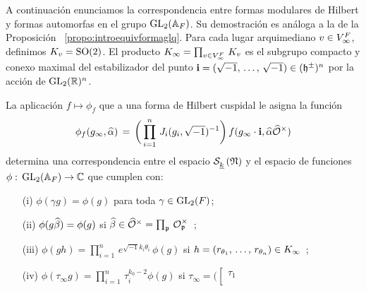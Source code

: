 A continuaci\'{o}n enunciamos la correspondencia entre formas modulares de
Hilbert y formas automorfas en el grupo $\GL_{2}(\adeles{F})$. Su
demostraci\'{o}n es an\'{a}loga a la de la Proposici\'{o}n~%
\ref{propo:introequivformaglq}.
Para cada lugar arquimediano $v\in\lugares[\infty]{F}$, definimos
$K_{v}=\SO{2}$. El producto $K_{\infty}=\prod_{v\in\lugares[\infty]{F}}\,K_{v}$
es el subgrupo compacto y conexo maximal del estabilizador
del punto $\mathbf{i}=(\sqrt{-1},\,\dots,\,\sqrt{-1})\in(\hP^{\pm})^{n}$ por la
acci\'{o}n de $\GL_{2}(\bb{R})^{n}$.

\begin{propoEquivalenciaAutomorfasFormasCuspidales}
	\label{propo:equivalenciaautomorfasformascuspidales}
	La aplicaci\'{o}n $f\mapsto\phi_{f}$ que a una forma de Hilbert
	cuspidal le asigna la funci\'{o}n
	\begin{equation}
		\label{eq:funcionadelicacorrespondientedehilbert}
		\phi_{f}(g_{\infty},\hhat{\alpha}) \,=\,
		\bigg(\prod_{i=1}^{n}\,J_{i}(g_{i},\sqrt{-1})^{-1}\bigg)\,
		f(g_{\infty}\cdot\mathbf{i},\hhat{\alpha}\Idfin{\cal{O}})
	\end{equation}
	determina una correspondencia entre el espacio $\spitzH{k}{\frak{N}}$
	y el espacio de funciones $\phi:\,\GL_{2}(\adeles{F})%
	\rightarrow\bb{C}$ que cumplen con:
	\begin{itemize}
		\item[(i)] $\phi(\gamma g)=\phi(g)$ para toda
			$\gamma\in\GL_{2}(F)$;
		\item[(ii)] $\phi(g\hhat{\beta})=\phi(g)$ si
			\begin{math}
				\hhat{\beta}\in\Idfin{\cal{O}}=
					\prod_{\frak{p}}\,
					\cal{O}_{\frak{p}}^{\times}
			\end{math}~;
		\item[(iii)]
			\begin{math}
				\phi(gh)=\prod_{i=1}^{n}\,
					e^{\sqrt{-1}k_{i}\theta_{i}}\,\phi(g)
			\end{math}
			si
			\begin{math}
				h=(\lista[\theta_{1}]{r}{\theta_{n}})
					\in K_{\infty}
			\end{math}~;
		\item[(iv)]
			\begin{math}
				\phi(\tau_{\infty}g)=\prod_{i=1}^{n}\,
				\tau_{i}^{k_{0}-2}\phi(g)
			\end{math}
			si
			\begin{math}
				\tau_{\infty}=\bigg(
				\left[\begin{matrix} \tau_{1} & \\

\end{matrix}
\end{math}
\end{itemize}
\end{propoEquivalenciaAutomorfasFormasCuspidales}
